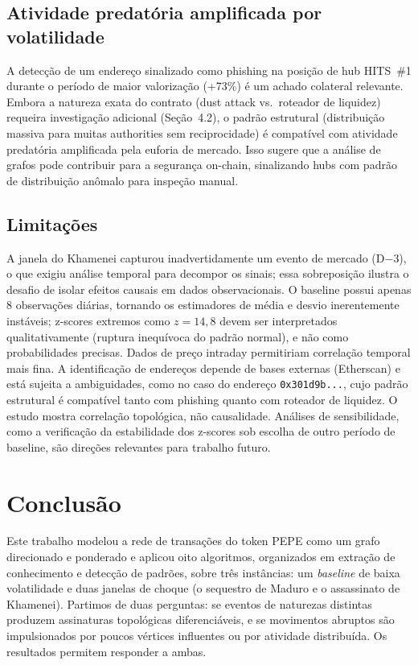 \documentclass[12pt,a4paper]{article}
\begin{document}
\subsection{Atividade predatória amplificada por volatilidade}

A detecção de um endereço sinalizado como phishing na posição de hub HITS~\#1 durante o período de maior valorização (+73\%) é um achado colateral relevante. Embora a natureza exata do contrato (dust attack vs.\ roteador de liquidez) requeira investigação adicional (Seção~4.2), o padrão estrutural (distribuição massiva para muitas authorities sem reciprocidade) é compatível com atividade predatória amplificada pela euforia de mercado. Isso sugere que a análise de grafos pode contribuir para a segurança on-chain, sinalizando hubs com padrão de distribuição anômalo para inspeção manual.

\subsection{Limitações}

A janela do Khamenei capturou inadvertidamente um evento de mercado (D$-$3), o que exigiu análise temporal para decompor os sinais; essa sobreposição ilustra o desafio de isolar efeitos causais em dados observacionais. O baseline possui apenas 8 observações diárias, tornando os estimadores de média e desvio inerentemente instáveis; z-scores extremos como $z = 14{,}8$ devem ser interpretados qualitativamente (ruptura inequívoca do padrão normal), e não como probabilidades precisas. Dados de preço intraday permitiriam correlação temporal mais fina. A identificação de endereços depende de bases externas (Etherscan) e está sujeita a ambiguidades, como no caso do endereço \texttt{0x301d9b...}, cujo padrão estrutural é compatível tanto com phishing quanto com roteador de liquidez. O estudo mostra correlação topológica, não causalidade. Análises de sensibilidade, como a verificação da estabilidade dos z-scores sob escolha de outro período de baseline, são direções relevantes para trabalho futuro.


\section{Conclusão}

Este trabalho modelou a rede de transações do token PEPE como um grafo direcionado e ponderado e aplicou oito algoritmos, organizados em extração de conhecimento e detecção de padrões, sobre três instâncias: um \textit{baseline} de baixa volatilidade e duas janelas de choque (o sequestro de Maduro e o assassinato de Khamenei). Partimos de duas perguntas: se eventos de naturezas distintas produzem assinaturas topológicas diferenciáveis, e se movimentos abruptos são impulsionados por poucos vértices influentes ou por atividade distribuída. Os resultados permitem responder a ambas.
\end{document}
